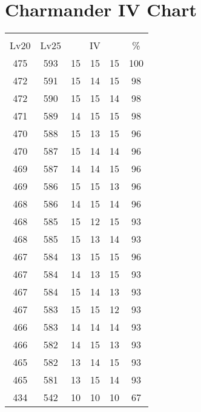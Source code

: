 \documentclass{article}%
\begin{document}
%
\normalsize%
\section{Charmander IV Chart}%
\label{sec:Charmander IV Chart}%
\renewcommand{\arraystretch}{1.5}%
\begin{tabular}{|c|c|c|c|c|c|}%
\hline%
\multicolumn{6}{|c|}{\textcolor{white}{ 
\linebreak{Charmander}
}%
\cellcolor{black}}\\%
\multicolumn{1}{|c}{Lv20}&\multicolumn{1}{c|}{Lv25}&\multicolumn{3}{c|}{IV}&\multicolumn{1}{|c|}{\%}\\%
\hline%
\rowcolor{color100}%
475&593&15&15&15&100\\%
\hline%
\rowcolor{color98}%
472&591&15&14&15&98\\%
\hline%
\rowcolor{color98}%
472&590&15&15&14&98\\%
\hline%
\rowcolor{color98}%
471&589&14&15&15&98\\%
\hline%
\rowcolor{color96}%
470&588&15&13&15&96\\%
\hline%
\rowcolor{color96}%
470&587&15&14&14&96\\%
\hline%
\rowcolor{color96}%
469&587&14&14&15&96\\%
\hline%
\rowcolor{color96}%
469&586&15&15&13&96\\%
\hline%
\rowcolor{color96}%
468&586&14&15&14&96\\%
\hline%
\rowcolor{color93}%
468&585&15&12&15&93\\%
\hline%
\rowcolor{color93}%
468&585&15&13&14&93\\%
\hline%
\rowcolor{color96}%
467&584&13&15&15&96\\%
\hline%
\rowcolor{color93}%
467&584&14&13&15&93\\%
\hline%
\rowcolor{color93}%
467&584&15&14&13&93\\%
\hline%
\rowcolor{color93}%
467&583&15&15&12&93\\%
\hline%
\rowcolor{color93}%
466&583&14&14&14&93\\%
\hline%
\rowcolor{color93}%
466&582&14&15&13&93\\%
\hline%
\rowcolor{color93}%
465&582&13&14&15&93\\%
\hline%
\rowcolor{color93}%
465&581&13&15&14&93\\%
\hline%
\rowcolor{color91}%
434&542&10&10&10&67\\%
\end{tabular}

%
\end{document}
